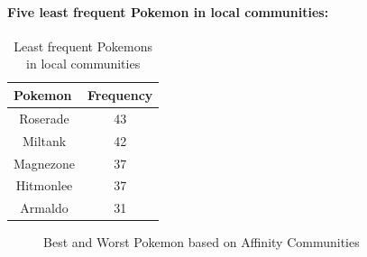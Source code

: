 \documentclass[10pt]{article}
\begin{document}
\paragraph{Five least frequent Pokemon in local communities:}

\begin{table}[H]
\centering
\begin{tabular}{|c|c|}
\hline
\multicolumn{1}{|l|}{\textbf{Pokemon}} &
  \multicolumn{1}{l|}{\textbf{Frequency}} \\ \hline
Roserade  & 43 \\ \hline
Miltank  & 42 \\ \hline
Magnezone  & 37 \\ \hline
Hitmonlee  & 37 \\ \hline
Armaldo  & 31 \\ \hline
\end{tabular}
\caption{Least frequent Pokemons in local communities}
\label{tab:my-table}
\end{table}

%
%
\begin{figure}[H]
    \centering
    \qquad
    \caption{Best and Worst Pokemon based on Affinity Communities}%
    \label{fig:example}%
\end{figure}
\end{document}
